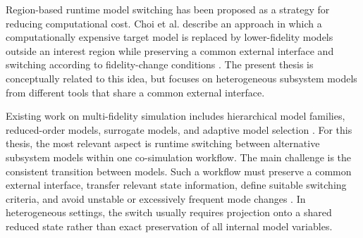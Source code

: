 Region-based runtime model switching has been proposed as a strategy for reducing computational cost.
Choi et al. describe an approach in which a computationally expensive target model is replaced by lower-fidelity models outside an interest region while preserving a common external interface and switching according to fidelity-change conditions \cite{Choi2014,Choi2017}.
The present thesis is conceptually related to this idea, but focuses on heterogeneous subsystem models from different tools that share a common external interface.

Existing work on multi-fidelity simulation includes hierarchical model families, reduced-order models, surrogate models, and adaptive model selection \cite{peherstorfer_survey_2018,fernandez-godino_review_2023}.
For this thesis, the most relevant aspect is runtime switching between alternative subsystem models within one co-simulation workflow.
The main challenge is the consistent transition between models.
Such a workflow must preserve a common external interface, transfer relevant state information, define suitable switching criteria, and avoid unstable or excessively frequent mode changes \cite{williams_switched-fidelity_2014}.
In heterogeneous settings, the switch usually requires projection onto a shared reduced state rather than exact preservation of all internal model variables.
